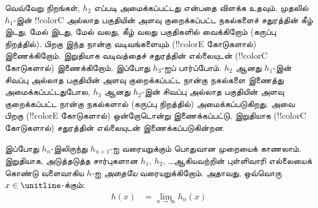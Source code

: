 \documentclass[../../../include/open-logic-section]{subfiles}
\begin{document}
வெவ்வேறு நிறங்கள், $h_2$ எப்படி அமைக்கப்பட்டது
என்பதை விளக்க உதவும். முதலில் $h_1$-இன் !!{colorC}
அல்லாத பகுதியின் அளவு குறைக்கப்பட்ட நகல்களைச்
சதுரத்தின் கீழ் இடது, மேல் இடது, மேல் வலது, கீழ்
வலது பகுதிகளில் வைக்கிறோம் (கருப்பு நிறத்தில்).
பிறகு இந்த நான்கு வடிவங்களையும் (!!{colorE} கோடுகளால்)
இணைக்கிறோம். இறுதியாக வடிவத்தைச் சதுரத்தின்
எல்லையுடன் (!!{colorC} கோடுகளால்) இணைக்கிறோம்.
இப்போது $h_3$-ஐப் பார்ப்போம். $h_2$ ஆனது
$h_1$-இன் சிவப்பு அல்லாத பகுதியின் அளவு குறைக்கப்பட்ட
நான்கு நகல்களை இணைத்து அமைக்கப்பட்டதுபோல,
$h_3$ ஆனது $h_2$-இன் சிவப்பு அல்லாத பகுதியின்
அளவு குறைக்கப்பட்ட நான்கு நகல்களால் (கருப்பு நிறத்தில்)
அமைக்கப்படுகிறது. அவை பிறகு (!!{colorE} கோடுகளால்)
ஒன்றோடொன்று இணைக்கப்பட்டு, இறுதியாக
(!!{colorC} கோடுகளால்) சதுரத்தின் எல்லையுடன்
இணைக்கப்படுகின்றன.
\begin{center}
\end{center}

இப்போது $h_n$-இலிருந்து $h_{n+1}$-ஐ
வரையறுக்கும் பொதுவான முறையைக் காணலாம்.
இறுதியாக, அடுத்தடுத்த சார்புகளான $h_1$, $h_2$,
\dots\@ ஆகியவற்றின் புள்ளிவாரி எல்லையைக் கொண்டு
வளைவாகிய $h$-ஐ \emph{அதையே} வரையறுக்கிறோம்.
அதாவது, ஒவ்வொரு $x \in \unitline$-க்கும்:
\begin{align*}
	h(x) &= \lim_{n \rightarrow \infty} h_n(x)
\end{align*}
\end{document}

